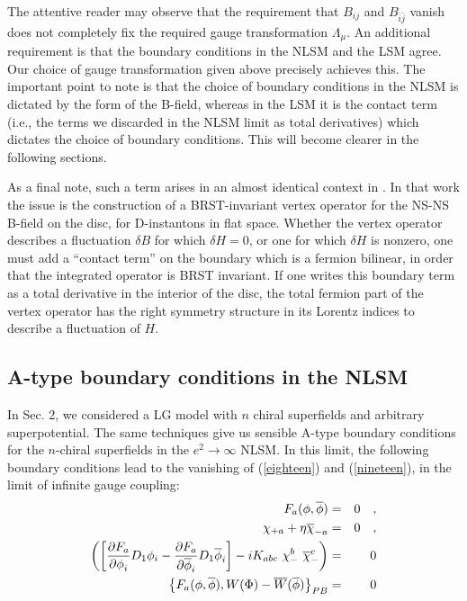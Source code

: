 \documentclass[a4paper,12pt]{article}
\begin{document}
The attentive reader may observe that the requirement that
$B_{ij}$ and $B_{\bar{i}\bar{j}}$ vanish does not completely
fix the required gauge transformation $\Lambda_\mu$. An additional
requirement is that the boundary conditions in the NLSM and the LSM
agree. Our choice of gauge
transformation given above precisely achieves this.
The important point to note is that the choice of boundary conditions in
the NLSM is dictated by the form of the B-field, whereas in the LSM it is the
contact term (i.e., the terms we discarded in the NLSM limit as total
derivatives) which dictates the choice of boundary conditions. 
This
will become clearer in the following sections. 

As a final note, such a term arises
in an almost identical context in \cite{gut}.
In that work the issue is the construction of
a BRST-invariant vertex operator for the NS-NS B-field
on the disc, for D-instantons in flat space.
Whether the vertex operator describes a fluctuation
$\delta B$ for which $\delta H = 0$, or one for
which $\delta H$ is nonzero, one must add
a ``contact term'' on the boundary which is a fermion
bilinear, in order that the integrated
operator is BRST invariant.  If one writes this
boundary term as a total derivative in the
interior of the disc,
the total fermion part of the vertex operator
has the right symmetry structure in its Lorentz indices to
describe a fluctuation of $H$.

\subsection{A-type boundary conditions in the NLSM}

In Sec. 2, we considered a LG model with $n$ chiral
superfields and arbitrary superpotential. The same techniques 
give us sensible A-type boundary conditions for the $n$-chiral
superfields in the $e^2 \rightarrow \infty$ NLSM.
In this limit, the following boundary conditions
lead to the vanishing of (\ref{eighteen}) and (\ref{nineteen}),
in the limit of infinite gauge coupling:
\begin{eqnarray}
F_a(\phi,\overline{\phi})&=&0\quad, \\
\chi_{+a} + \eta \overline{\chi}_{-a} &=&0\quad, \\
\left(
\left[{{\partial F_a}\over{\partial\phi}_i}
D_1\phi_i
- {{\partial F_a}\over{\partial\overline{\phi}_i}}
D_1\overline{\phi}_i\right]
-i K_{abc}\ \chi_{-}^b\ \overline{\chi}_{-}^c \right) &=&0\\
\left\{F_a(\phi,\overline{\phi}),W(\Phi)-\overline{W}(\overline{\phi})
\right\}_{PB}&=&0
\end{eqnarray}
\end{document}
